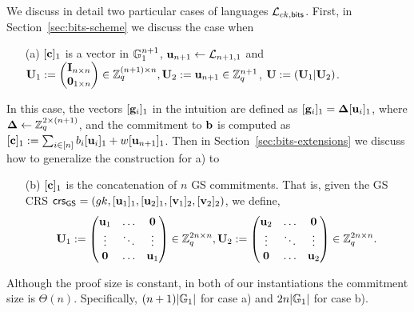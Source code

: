 We discuss in detail two particular cases of languages $\mathcal{\mathcal{L}}_{ck,\mathsf{bits}}$. First, in Section~\ref{sec:bits-scheme} we discuss the case when 
\begin{itemize}
\item[(a)] $[\mathbf{c}]_1$ is a vector in $\mathbb{G}_1^{n+1}$,  $\mathbf{u}_{n+1} \leftarrow \mathcal{L}_{n+1,1}$ and
 $\mathbf{{U}}_1:=\begin{pmatrix}{\mathbf{{I}}_{n\times n}}\\{\mathbf{{0}}_{1\times n}}\end{pmatrix} \in \mathbb{Z}_q^{(n+1) \times n}, \mathbf{{U}}_2:=\mathbf{u}_{n+1} \in \mathbb{Z}_q^{n+1}$, $\mathbf{{U}}:=(\mathbf{{U}}_1| \mathbf{{U}}_2)$.    
\end{itemize}
In this case, the vectors $[\mathbf{g}_i]_1$ in the intuition are defined as $[\mathbf{g}_i]_1=\mathbf{{\Delta}} [\mathbf{u}_i]_1$, where $\mathbf{{\Delta}}\gets\mathbb{Z}_q^{2\times(n+1)}$, and the commitment 
to $\mathbf{b}$ is computed as $[\mathbf{c}]_1:=\sum_{i\in[n]}b_i[\mathbf{u}_i]_1+w[\mathbf{u}_{n+1}]_1$.
Then in Section~\ref{sec:bits-extensions} we discuss how to generalize the construction for a) to 
\begin{itemize}
 \item[(b)] $[\mathbf{c}]_1$ is the concatenation of $n$ GS commitments. That is, given the  GS CRS   $\mathsf{crs}_{\mathsf{GS}}=(gk,[\mathbf{u}_1]_1,[\mathbf{u}_2]_1,[\mathbf{v}_1]_2,[\mathbf{v}_2]_2)$, we define,
$$\mathbf{{U}}_1:=  \begin{pmatrix} \mathbf{u}_1 & \ldots & \mathbf{0}\\ \vdots & \ddots & \vdots \\   \mathbf{0} & \ldots & \mathbf{u}_1  \end{pmatrix} \in \mathbb{Z}_q^{2n \times n},  \mathbf{{U}}_2:= \begin{pmatrix} \mathbf{u}_2 & \ldots & \mathbf{0}\\ \vdots & \ddots & \vdots \\  \mathbf{0} & \ldots & \mathbf{u}_2  \end{pmatrix} \in \mathbb{Z}_q^{2n \times n}.$$ 
\end{itemize}

Although the proof size is constant, in both of our instantiations the commitment size is $\Theta(n)$. Specifically, $(n+1)|\mathbb{G}_1|$ for case a) and $2n|\mathbb{G}_1|$ for case b).


